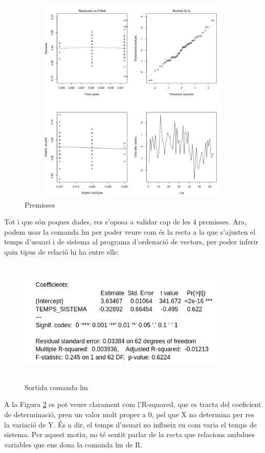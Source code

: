 \documentclass[12pt]{article}
\begin{document}
\begin{figure}[h!]
  \centering
  \includegraphics[width=15cm, height=10cm]{prem2.png}
  \caption{Premisses}
  \label{fig:prem2}
\end{figure} 

Tot i que són poques dades, res s'oposa a validar cap de les 4 premisses.
Ara, podem usar la comanda lm per poder veure com és la recta a la que s'ajusten el temps d'usuari i de sistema al programa d'ordenació
de vectors, per poder inferir quin tipus de relació hi ha entre ells:

\begin{figure}[h!]
  \centering
  \includegraphics[width=10cm, height=6cm]{lm2.png}
  \caption{Sortida comanda lm}
  \label{fig:lm2}
\end{figure} 

A la Figura \ref{fig:lm2} es pot veure clarament com l'R-squared, que es tracta del coeficient de determinació, pren un valor molt proper
a 0, pel que X no determina per res la variació de Y. És a dir, el temps d'usuari no influeix en com varia el temps de sistema. Per aquest
motiu, no té sentit parlar de la recta que relacions ambdues variables que ens dona la comanda lm de R.
\end{document}
